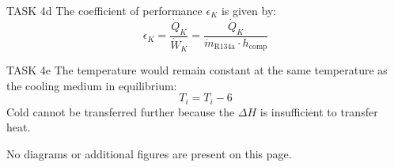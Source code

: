 TASK 4d  
The coefficient of performance \( \epsilon_K \) is given by:  
\[
\epsilon_K = \frac{\dot{Q}_K}{\dot{W}_K} = \frac{\dot{Q}_K}{\dot{m}_{\text{R134a}} \cdot h_{\text{comp}}}
\]  

TASK 4e  
The temperature would remain constant at the same temperature as the cooling medium in equilibrium:  
\[
T_i = T_i - 6
\]  
Cold cannot be transferred further because the \( \Delta H \) is insufficient to transfer heat.  

No diagrams or additional figures are present on this page.